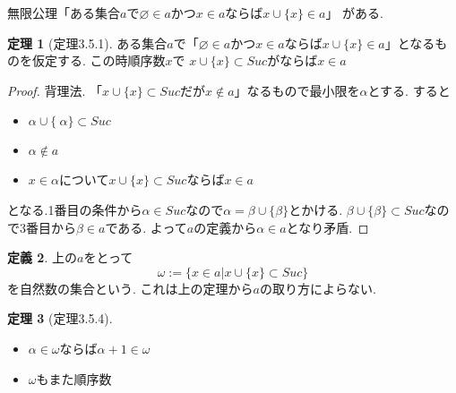 \documentclass[dvipdfmx,a4paper,11pt]{report}
\theoremstyle{definition}
\newtheorem{thm}{定理}
\newtheorem{dfn}[thm]{定義}
\begin{document}
無限公理「ある集合$a$で$\varnothing \in a$かつ$x \in a$ならば$x \cup \{ x\} \in a$」
がある.

 \begin{tcolorbox}
 [colback = white, colframe = green!35!black, fonttitle = \bfseries,breakable = true]
\begin{thm}[定理3.5.1]
ある集合$a$で「$\varnothing \in a$かつ$x \in a$ならば$x \cup \{ x\} \in a$」となるものを仮定する.
この時順序数$x$で
$x \cup \{ x\} \subset Suc$がならば$x \in a$
\end{thm}
\end{tcolorbox}

\begin{proof}
背理法. 「$x \cup \{ x\} \subset Suc$だが$x \not \in a$」なるもので最小限を$\alpha$とする.
すると
\begin{itemize}
\item $\alpha \cup \{\ \alpha\} \subset Suc$
\item $\alpha \not \in a$
\item $x \in \alpha$について$x \cup \{ x\} \subset Suc$ならば$x \in a$
\end{itemize}
となる.1番目の条件から$\alpha \in Suc$なので$\alpha = \beta \cup \{ \beta\}$とかける.
$\beta \cup \{ \beta\} \subset Suc$なので3番目から$\beta \in a$である.
よって$a$の定義から$\alpha \in a$となり矛盾.
\end{proof}

 \begin{tcolorbox}
 [colback = white, colframe = green!35!black, fonttitle = \bfseries,breakable = true]
\begin{dfn}
上の$a$をとって
$$
\omega:= \{x  \in a| x \cup \{ x\} \subset Suc\}
$$
を自然数の集合という.
これは上の定理から$a$の取り方によらない. 
\end{dfn}
\end{tcolorbox}

 \begin{tcolorbox}
 [colback = white, colframe = green!35!black, fonttitle = \bfseries,breakable = true]
\begin{thm}[定理3.5.4]
\begin{itemize}
\item $\alpha \in \omega$ならば$\alpha + 1 \in \omega$
\item $\omega$もまた順序数
\end{itemize}
\end{thm}
\end{tcolorbox}
\end{document}
